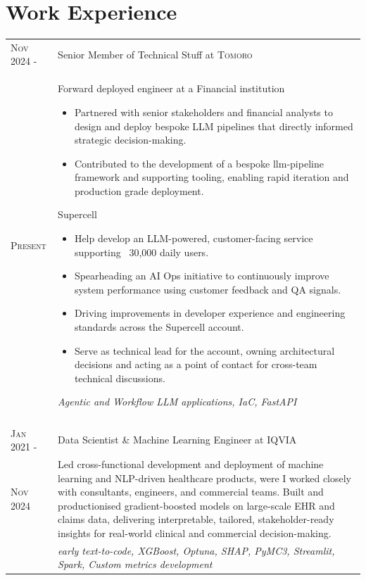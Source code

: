 \documentclass[a4paper,11pt]{article}
\begin{document}
\section{Work Experience}
\begin{tabular}{>{\raggedleft\arraybackslash}p{2cm}|p{12.9cm}}

 \textsc{Nov 2024 -}& Senior Member of Technical Stuff at \textsc{Tomoro} \\
 \textsc{Present}&
 \footnotesize
 Forward deployed engineer at a Financial institution
 \begin{itemize}[ itemsep=0em, leftmargin=2em]
 \item Partnered with senior stakeholders and financial analysts to design and deploy bespoke LLM pipelines that directly informed strategic decision-making.
 \item Contributed to the development of a bespoke llm-pipeline framework and supporting tooling, enabling rapid iteration and production grade deployment.

 \end{itemize}

Supercell
\begin{itemize}[ itemsep=0em, leftmargin=2em]
 \item Help develop an LLM-powered, customer-facing service supporting ~30,000 daily users.
 \item Spearheading an AI Ops initiative to continuously improve system performance using customer feedback and QA signals.
 \item Driving improvements in developer experience and engineering standards across the Supercell account.
\item Serve as technical lead for the account, owning architectural decisions and acting as a point of contact for cross-team technical discussions.
 \end{itemize}
\textit{Agentic and Workflow LLM applications, IaC, FastAPI}

\\\multicolumn{2}{c}{} \\

 \textsc{Jan 2021 -}& Data Scientist \& Machine Learning Engineer at \textsc{IQVIA} \\
 \textsc{Nov 2024}&
 \footnotesize{ 
 \vspace*{-\baselineskip}

 Led cross-functional development and deployment of machine learning and NLP-driven healthcare products, were I worked closely with consultants, engineers, and commercial teams. Built and productionised gradient-boosted models on large-scale EHR and claims data, delivering interpretable, tailored, stakeholder-ready insights for real-world clinical and commercial decision-making.}\\&
\footnotesize{\textit{early text-to-code, XGBoost, Optuna, SHAP, PyMC3, Streamlit, Spark, Custom metrics development}}


\end{tabular}
\end{document}
